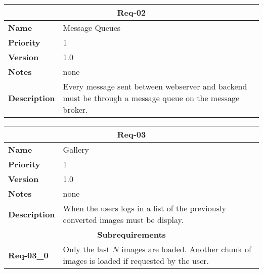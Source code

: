 \documentclass[../documentation.tex]{subfiles}
\begin{document}
\bgroup{}
\def\arraystretch{1.25}
\begin{center}
    \begin{tabular}{ |l|p{9cm}| }
        \hline
        \multicolumn{2}{|c|}{\textbf{Req-02}} \\
        \hline
        \textbf{Name} & Message Queues \\
        \hline
        \textbf{Priority} & 1 \\
        \hline
        \textbf{Version} & 1.0 \\
        \hline
        \textbf{Notes} & none \\
        \hline
        \textbf{Description} & Every message sent between webserver and backend
            must be through a message queue on the message broker. \\
        \hline
    \end{tabular}
\end{center}
\egroup{}

\bgroup{}
\def\arraystretch{1.25}
\begin{center}
    \begin{tabular}{ |l|p{9cm}| }
        \hline
        \multicolumn{2}{|c|}{\textbf{Req-03}} \\
        \hline
        \textbf{Name} & Gallery \\
        \hline
        \textbf{Priority} & 1 \\
        \hline
        \textbf{Version} & 1.0 \\
        \hline
        \textbf{Notes} & none \\
        \hline
        \textbf{Description} & When the users logs in a list of the previously converted images must be display. \\
        \hline
        \multicolumn{2}{|c|}{\textbf{Subrequirements}} \\
        \hline
        \textbf{Req-03\_0} & Only the last \(N\) images are loaded. Another chunk of images is loaded if requested by the user. \\
        \hline
    \end{tabular}
\end{center}
\egroup{}
\end{document}
